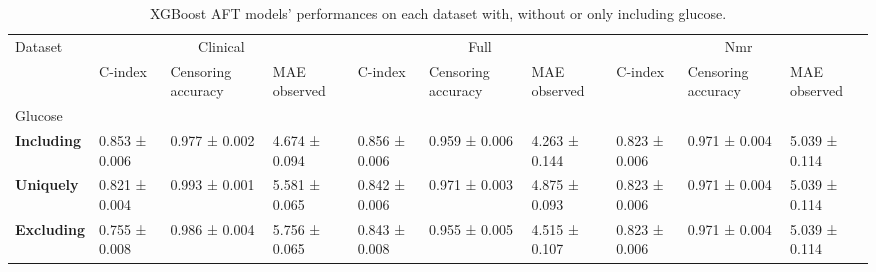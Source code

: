 \begin{table}
\caption{XGBoost AFT models' performances on each dataset with, without or only including glucose.}
\label{tab:glucose_res}
\begin{tabular}{llllllllll}
\toprule
Dataset & \multicolumn{3}{c}{Clinical} & \multicolumn{3}{c}{Full} & \multicolumn{3}{c}{Nmr} \\
 & C-index & Censoring accuracy & MAE observed & C-index & Censoring accuracy & MAE observed & C-index & Censoring accuracy & MAE observed \\
Glucose &  &  &  &  &  &  &  &  &  \\
\midrule
\textbf{Including} & 0.853 ± 0.006 & 0.977 ± 0.002 & 4.674 ± 0.094 & 0.856 ± 0.006 & 0.959 ± 0.006 & 4.263 ± 0.144 & 0.823 ± 0.006 & 0.971 ± 0.004 & 5.039 ± 0.114 \\
\textbf{Uniquely} & 0.821 ± 0.004 & 0.993 ± 0.001 & 5.581 ± 0.065 & 0.842 ± 0.006 & 0.971 ± 0.003 & 4.875 ± 0.093 & 0.823 ± 0.006 & 0.971 ± 0.004 & 5.039 ± 0.114 \\
\textbf{Excluding} & 0.755 ± 0.008 & 0.986 ± 0.004 & 5.756 ± 0.065 & 0.843 ± 0.008 & 0.955 ± 0.005 & 4.515 ± 0.107 & 0.823 ± 0.006 & 0.971 ± 0.004 & 5.039 ± 0.114 \\
\bottomrule
\end{tabular}
\end{table}
